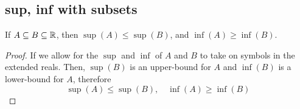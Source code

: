 \documentclass[../../main.tex]{subfiles}
\begin{document}
\subsection{sup, inf with subsets}
\begin{wts}\label{lemma:sup inf with subsets}
    If $A\subseteq B\subseteq \mathbb{R}$, then $\sup(A)\leq \sup(B)$, and $\inf(A)\geq \inf(B)$.
\end{wts}
\begin{proof}
    If we allow for the $\sup$ and $\inf$ of $A$ and $B$ to take on symbols in the extended reals. Then, $\sup(B)$ is an upper-bound for $A$ and $\inf(B)$ is a lower-bound for $A$, therefore
    \[
    \sup(A)\leq \sup(B),\quad \inf(A)\geq \inf(B)
    \]
\end{proof}
\end{document}

